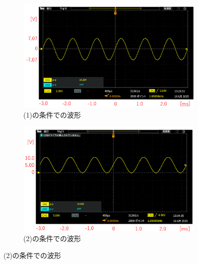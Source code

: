 \documentclass[uplatex, a4j, dvipdfmx]{jsarticle}
\begin{document}
\begin{figure}[htbp]
    \centering
    \begin{subfigure}[b]{0.48\textwidth}
        \centering
        \includegraphics[width=\linewidth]{picture/O3.png}
        \caption{(1)の条件での波形}
        \label{O3}
    \end{subfigure}
    \hfill
    \begin{subfigure}[b]{0.48\textwidth}
        \centering
        \includegraphics[width=\linewidth]{picture/O4.png}
        \caption{(2)の条件での波形}
        \label{O4}
    \end{subfigure}
    
    \vspace{1ex}
    

\end{figure}
\end{document}

